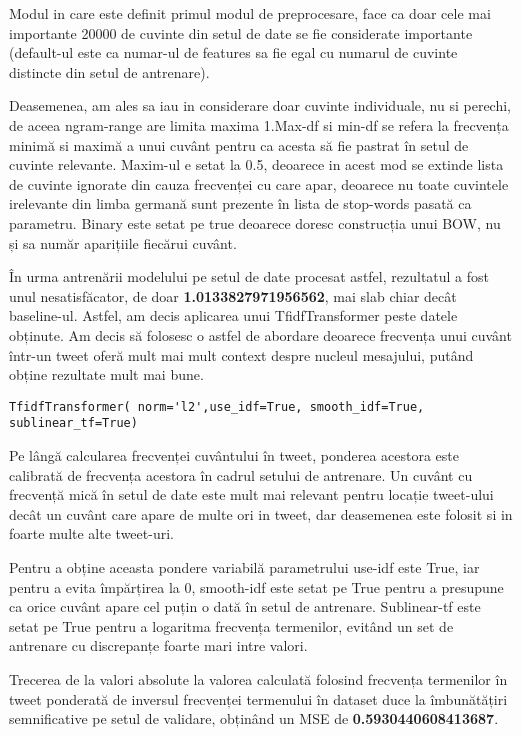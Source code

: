 \documentclass[a4paper,12pt]{article}
\begin{document}
\par Modul in care este definit primul modul de preprocesare, face ca doar cele mai importante 20000 de cuvinte din setul de date se fie considerate importante (default-ul este ca numar-ul de features sa fie egal cu numarul de cuvinte distincte din setul de antrenare). 
\par Deasemenea, am ales sa iau in considerare doar cuvinte individuale, nu si perechi, de aceea ngram-range are limita maxima 1.Max-df si min-df  se refera la frecvența minimă si maximă a unui cuvânt pentru ca acesta să fie pastrat în setul de cuvinte relevante. Maxim-ul e setat la 0.5, deoarece in acest mod se extinde lista de cuvinte ignorate din cauza frecvenței cu care apar, deoarece nu toate cuvintele irelevante din limba germană sunt prezente în lista de stop-words pasată ca parametru. Binary este setat pe true deoarece doresc construcția unui BOW, nu și sa număr aparițiile fiecărui cuvânt.

În urma antrenării modelului pe setul de date procesat astfel, rezultatul a fost unul nesatisfăcator, de doar \textbf{1.0133827971956562}, mai slab chiar decât baseline-ul. 
Astfel, am decis aplicarea unui TfidfTransformer peste datele obținute. Am decis să folosesc o astfel de abordare deoarece frecvența unui cuvânt într-un tweet oferă mult mai mult context despre nucleul mesajului, putând obține rezultate mult mai bune. 
\begin{verbatim}
TfidfTransformer( norm='l2',use_idf=True, smooth_idf=True, sublinear_tf=True)
\end{verbatim} 
\par Pe lângă calcularea frecvenței cuvântului în tweet, ponderea acestora este calibrată de frecvența acestora în cadrul setului de antrenare. Un cuvânt cu frecvență mică în setul de date este mult mai relevant pentru locație tweet-ului decât un cuvânt care apare de multe ori in tweet, dar deasemenea este folosit si in foarte multe alte tweet-uri. 
\par Pentru a obține aceasta pondere variabilă parametrului use-idf este True, iar pentru a evita împărțirea la 0, smooth-idf este setat pe True pentru a presupune ca orice cuvânt apare cel puțin o dată în setul de antrenare. Sublinear-tf este setat pe True pentru a logaritma frecvența termenilor, evitând un set de antrenare cu discrepanțe foarte mari intre valori. 

\par Trecerea de la valori absolute la valorea calculată folosind frecvența termenilor în tweet ponderată de inversul frecvenței termenului în dataset duce la îmbunătățiri semnificative pe setul de validare, obținând un MSE de \textbf{0.5930440608413687}. 
\end{document}

